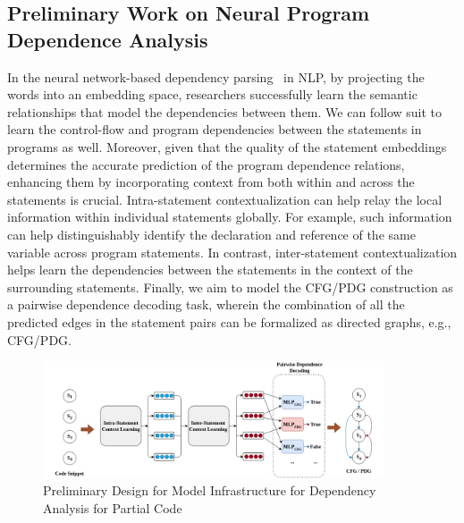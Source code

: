 \subsection{Preliminary Work on Neural Program Dependence Analysis}
\label{sec:deeppda}

In the neural network-based dependency
parsing~\cite{chen-manning-2014-fast} in NLP, by projecting the words
into an embedding space, researchers successfully learn the semantic
relationships that model the dependencies between them. We can follow
suit to learn the control-flow and program dependencies between the
statements in programs as well. Moreover, given that the quality of
the statement embeddings determines the accurate prediction of the
program dependence relations, enhancing them by incorporating context
from both within and across the statements is crucial. Intra-statement
contextualization can help relay the local information within
individual statements globally. For example, such information can help
distinguishably identify the declaration and reference of the same
variable across  program statements. In contrast,
inter-statement contextualization helps learn the dependencies between
the statements in the context of the surrounding statements. Finally,
we aim to model the CFG/PDG construction as a pairwise dependence
decoding task, wherein the combination of all the predicted edges in
the statement pairs can be formalized as directed graphs, e.g., CFG/PDG.

\begin{figure}[t]
\begin{center}
    \includegraphics[width=0.9\textwidth]{model-abstract.jpg}
    \caption{Preliminary Design for \tool Model Infrastructure for Dependency Analysis for Partial Code}
    \label{fig:model}
    \vspace{-26pt}
\end{center}
\end{figure}


